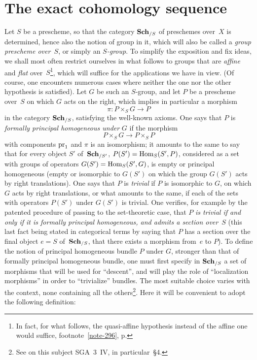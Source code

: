 \section{The exact cohomology sequence}
\label{XI.4}

Let $S$ be a prescheme, so that the category
$\mathbf{Sch}_{/S}$ of preschemes over~$X$ is determined,
hence also the notion of group in it, which will also be called a
\emph{group prescheme over~$S$}, or simply an
\emph{$S$-group}. To simplify the exposition and fix
ideas, we shall most often restrict ourselves in what follows to
groups that are \emph{affine} and \emph{flat} over~$S$\kern1pt\footnote{In
fact, for what follows, the quasi-affine hypothesis instead
of the affine one would suffice, \cf footnote~\eqref{note-296}, p\ptbl\pageref{note-296}.}, which will
suffice for the applications we have in view. (Of course, one
encounters numerous cases where neither the one nor the other hypothesis
is satisfied). Let
$G$ be such an $S$-group, and let $P$ be a prescheme over~$S$ on
which $G$ acts on the right, which implies in particular a
morphism
$$
\pi:P\times_SG\to P
$$
in the category $\mathbf{Sch}_{/S}$, satisfying the well-known
axioms. One says that $P$ is \emph{formally principal homogeneous
under} $G$ if the morphism
$$
P\times_S G\to P\times_S P
$$
with components $\mathrm{pr}_1$ and $\pi$ is an isomorphism; it amounts to the
same to say that for every object $S'$ of~$\mathbf{Sch}_{/S'}$,
$P(S')=\operatorname{Hom}_S(S',P)$, considered as a set with groups
of operators $G(S')=\operatorname{Hom}_S(S',G)$, is empty or principal
homogeneous (\ie empty or isomorphic to $G(S')$ on which the
group $G(S')$ acts by right translations). One says that
$P$ is \emph{trivial} if $P$ is isomorphic to $G$, on which $G$
acts by right translations, or what amounts to the
same, if each of the sets with operators $P(S')$ under
$G(S')$ is trivial. One verifies, for example by the
patented procedure of passing to the set-theoretic case, that $P$
\emph{is trivial if and only if it
is formally principal homogeneous, and admits a section over~$S$}
(this last fact being stated in categorical terms by
saying that $P$ has a section over the final object $e=S$ of~$\mathbf{Sch}_{/S}$,
\ie that there exists a morphism from~$e$ to $P$). To define the
notion of principal homogeneous bundle $P$ under $G$, stronger
than that of formally principal homogeneous bundle, one must
first specify in $\mathbf{Sch}_{/S}$ a set of morphisms that
will be used for ``descent'', and will play the role of
``localization morphisms'' in order to ``trivialize'' bundles. The
most suitable choice varies with the context, none
containing all the others\footnote{\label{note-293}See on this subject
SGA~3~IV, in particular~\S 4.}. Here it will be convenient to adopt the
following definition:

